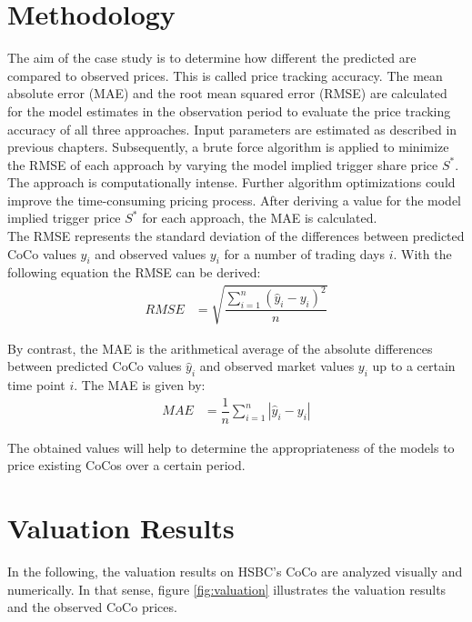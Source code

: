 \section{Methodology}

The aim of the case study is to determine how different the predicted are compared to observed prices. This is called price tracking accuracy. The mean absolute error (MAE) and the root mean squared error (RMSE) are calculated for the model estimates in the observation period to evaluate the price tracking accuracy of all three approaches. Input parameters are estimated as described in previous chapters. Subsequently, a brute force algorithm is applied to minimize the RMSE of each approach by varying the model implied trigger share price $S^*$. The approach is computationally intense. Further algorithm optimizations could improve the time-consuming pricing process. After deriving a value for the model implied trigger price $S^*$ for each approach, the MAE is calculated.\\  

The RMSE represents the standard deviation of the differences between predicted CoCo values $\hat{y}_i$ and observed values $y_i$ for a number of trading days $i$. With the following equation the RMSE can be derived:
\begin{align}
RMSE &= \sqrt{\dfrac{\sum_{i=1}^{n} \left( \hat{y}_i - y_i \right)^2}{n}}
\end{align}

By contrast, the MAE is the arithmetical average of the absolute differences between predicted CoCo values $\hat{y}_i$ and observed market values $y_i$ up to a certain time point $i$. The MAE is given by:
\begin{align}
MAE &= \dfrac{1}{n} \sum_{i=1}^{n} |\hat{y}_i - y_i | 
\end{align}

The obtained values will help to determine the appropriateness of the models to price existing CoCos over a certain period.

\section{Valuation Results}

In the following, the valuation results on HSBC's CoCo are analyzed visually and numerically. In that sense, figure \ref{fig:valuation} illustrates the valuation results and the observed CoCo prices.
 
